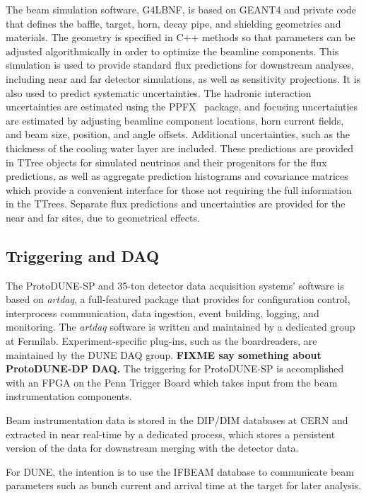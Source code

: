 The beam simulation software, G4LBNF, is based on GEANT4 and private code that defines the baffle, target, horn,
decay pipe, and shielding geometries and materials.  The geometry is specified in C++ methods so that parameters
can be adjusted algorithmically in order to optimize the beamline components.  This simulation is used to provide
standard flux predictions for downstream analyses, including near and far detector simulations, as well as
sensitivity projections.  It is also used to predict systematic uncertainties.  The hadronic interaction uncertainties
are estimated using the PPFX~\cite{ppfx} package, and focusing uncertainties are estimated by adjusting 
beamline component locations, horn current fields, and beam size, position, and angle offsets.  Additional
uncertainties, such as the thickness of the cooling water layer are included.  These predictions are provided
in TTree objects for simulated neutrinos and their progenitors for the flux predictions, as well as aggregate
prediction histograms and covariance matrices which provide a convenient interface for those not requiring the
full information in the TTrees.  Separate flux predictions and uncertainties are provided for the near and far
sites, due to geometrical effects.

\subsection{Triggering and DAQ}

The ProtoDUNE-SP and 35-ton detector data acquisition systems'
software is based on {\it artdaq}, a full-featured package that provides
for configuration control, interprocess communication, data ingestion, event building, logging, and monitoring.
The {\it artdaq} software is written and maintained by a dedicated group at Fermilab.  Experiment-specific plug-ins,
such as the boardreaders, are maintained by the DUNE DAQ group.  {\bf FIXME say something about ProtoDUNE-DP DAQ.}
The triggering for ProtoDUNE-SP is accomplished with an FPGA on the Penn Trigger Board which takes input from
the beam instrumentation components. 

Beam instrumentation data is stored in the DIP/DIM databases at CERN and extracted in near real-time by a dedicated
process, which stores a persistent version of the data for downstream merging with the detector data.

For DUNE, the intention is to use the IFBEAM database to communicate beam parameters such as bunch current
and arrival time at the target for later analysis.

